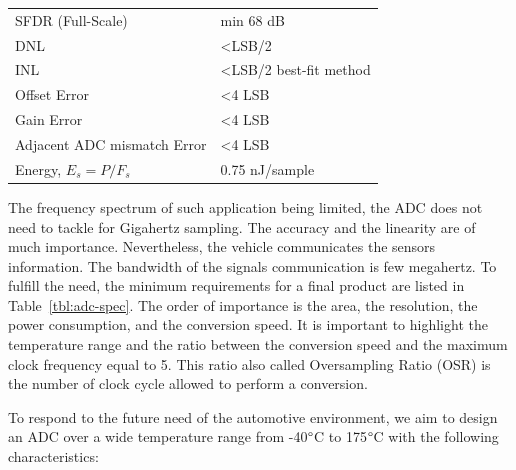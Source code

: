\begin{table}[htp]
\begin{tabular}{ll}
		SFDR (Full-Scale)                & min 68 dB                                                                                               \\
		DNL                              & \textless LSB/2                                                                                       \\
		INL                              & \textless LSB/2 best-fit method                                                                                    \\
		Offset Error                     & \textless 4 LSB                                                                                                                                             \\
		Gain Error                       & \textless 4 LSB                                                                                                                                             \\
		Adjacent ADC mismatch Error      & \textless 4 LSB                                                                                                                                             \\
		Energy, $E_s = P/F_s$            & 0.75 nJ/sample      \\ \bottomrule                                                                                                                                       
	\end{tabular}
\end{table}

The frequency spectrum of such application being limited, the ADC does not need to tackle for Gigahertz sampling. The accuracy and the linearity are of much importance. Nevertheless, the vehicle communicates the sensors information. The bandwidth of the signals communication is few megahertz.
To fulfill the need, the minimum requirements for a final product are listed in Table~\ref{tbl:adc-spec}. The order of importance is the area, the resolution, the power consumption, and the conversion speed. It is important to highlight the temperature range and the ratio between the conversion speed and the maximum clock frequency equal to 5. This ratio also called Oversampling Ratio (OSR) is the number of clock cycle allowed to perform a conversion.

To respond to the future need of the automotive environment, we aim to design an ADC over a wide temperature range from -40\(\degree \)C to 175\(\degree \)C with the following characteristics:


